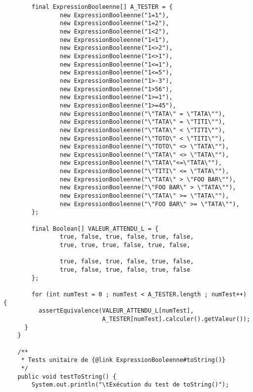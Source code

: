 \begin{enum}
\begin{verbatim}
        final ExpressionBooleenne[] A_TESTER = {
                new ExpressionBooleenne("1=1"),
                new ExpressionBooleenne("1=2"),
                new ExpressionBooleenne("1<2"),
                new ExpressionBooleenne("1<1"),
                new ExpressionBooleenne("1<>2"),
                new ExpressionBooleenne("1<>1"),
                new ExpressionBooleenne("1<=1"),
                new ExpressionBooleenne("1<=5"),
                new ExpressionBooleenne("1>-3"),
                new ExpressionBooleenne("1>56"),
                new ExpressionBooleenne("1>=1"),
                new ExpressionBooleenne("1>=45"),
                new ExpressionBooleenne("\"TATA\" = \"TATA\""),
                new ExpressionBooleenne("\"TATA\" = \"TITI\""),
                new ExpressionBooleenne("\"TATA\" < \"TITI\""),
                new ExpressionBooleenne("\"TOTO\" < \"TITI\""),
                new ExpressionBooleenne("\"TOTO\" <> \"TATA\""),
                new ExpressionBooleenne("\"TATA\" <> \"TATA\""),
                new ExpressionBooleenne("\"TATA\"<=\"TATA\""),
                new ExpressionBooleenne("\"TITI\" <= \"TATA\""),
                new ExpressionBooleenne("\"TATA\" > \"FOO BAR\""),
                new ExpressionBooleenne("\"FOO BAR\" > \"TATA\""),
                new ExpressionBooleenne("\"TATA\" >= \"TATA\""),
                new ExpressionBooleenne("\"FOO BAR\" >= \"TATA\""),
        };
        
        final Boolean[] VALEUR_ATTENDU_L = {
                true, false, true, false, true, false, 
                true, true, true, false, true, false, 
                
                true, false, true, false, true, false,
                true, false, true, false, true, false
        };
        
        for (int numTest = 0 ; numTest < A_TESTER.length ; numTest++) {
          assertEquivalence(VALEUR_ATTENDU_L[numTest], 
                            A_TESTER[numTest].calculer().getValeur());
      }
    }
    
    /** 
     * Tests unitaire de {@link ExpressionBooleenne#toString()}
     */
    public void testToString() {
        System.out.println("\tExécution du test de toString()");
        

\end{verbatim}
\end{enum}
